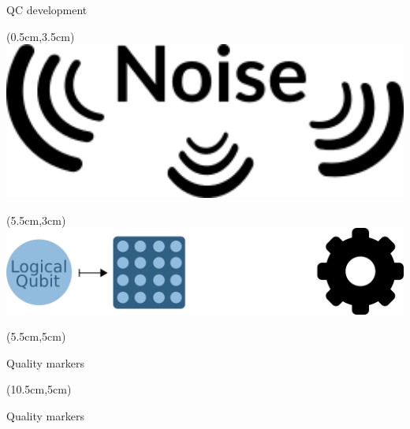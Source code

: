 \documentclass{dfki}
\begin{document}
\begin{frame}{QC development}
	\begin{textblock*}{3cm}(0.5cm,3.5cm)
		\includegraphics[width=1\textwidth]{fig/slim_noise.png}
	\end{textblock*}
	\begin{overlayarea}{\textwidth}{3cm}
		\vspace{0cm}
		\hspace{3cm}
	\end{overlayarea}

	\begin{textblock*}{8cm}(5.5cm,3cm)
		\includegraphics[width=1\textwidth]{fig/overview_setup.png}
	\end{textblock*}
	\begin{textblock*}{3.5cm}(5.5cm,5cm)
		\begin{tcolorbox}[colback=osakared!5!white, colframe=osakared, width=4cm, arc=2mm]
			\center
			Quality markers
		\end{tcolorbox}
	\end{textblock*}
	\begin{textblock*}{3.5cm}(10.5cm,5cm)
		\begin{tcolorbox}[colback=osakared!5!white, colframe=osakared, width=4cm, arc=2mm]
			\center
			Quality markers
		\end{tcolorbox}
	\end{textblock*}
\end{frame}
\end{document}
